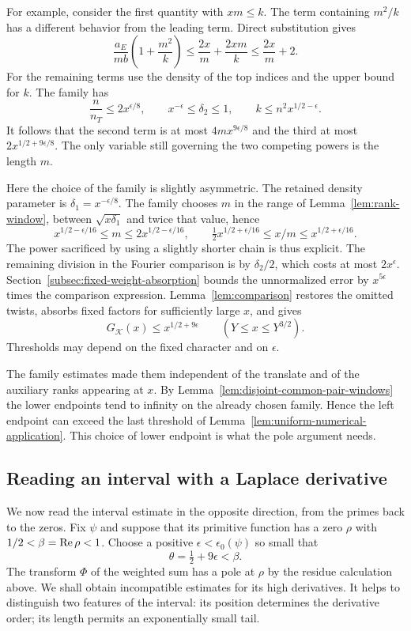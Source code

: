 For example, consider the first quantity with \(xm\le k\).
The term containing \(m^2/k\) has a different behavior from the
leading term. Direct substitution gives
\[
 \frac{a_E}{mb}\left(1+\frac{m^2}{k}\right)
       \le \frac{2x}{m}+\frac{2xm}{k}
       \le \frac{2x}{m}+2 .
\]
For the remaining terms use the density of the top indices and
the upper bound for \(k\). The family has
\[
       \frac{n}{n_T}\le2x^{\epsilon/8},\qquad
       x^{-\epsilon}\le\delta_2\le1,\qquad
       k\le n^2 x^{1/2-\epsilon}.
\]
It follows that the second term is at most \(4m x^{9\epsilon/8}\)
and the third at most \(2x^{1/2+9\epsilon/8}\). The only variable
still governing the two competing powers is the length \(m\).

Here the choice of the family is slightly asymmetric. The retained
density parameter is \(\delta_1=x^{-\epsilon/8}\).
The family chooses \(m\) in the range of Lemma~\ref{lem:rank-window}, between
\(\sqrt{x\delta_1}\) and twice that value, hence
\[
 x^{1/2-\epsilon/16}\le m\le 2x^{1/2-\epsilon/16},
 \qquad
 \tfrac12 x^{1/2+\epsilon/16}\le x/m\le x^{1/2+\epsilon/16}.
\]
The power sacrificed by using a slightly shorter chain is thus
explicit. The remaining division in the Fourier comparison is by
\(\delta_2/2\), which costs at most \(2x^\epsilon\).
Section~\ref{subsec:fixed-weight-absorption} bounds the unnormalized
error by \(x^{5\epsilon}\) times the comparison expression.
Lemma~\ref{lem:comparison} restores the omitted twists, absorbs
fixed factors for sufficiently large \(x\), and gives
\[
       G_{\mathcal K}(x)\le x^{1/2+9\epsilon}
                          \qquad(Y\le x\le Y^{3/2}).
\]
Thresholds may depend on the fixed character and on \(\epsilon\).

The family estimates made them independent of the translate and of
the auxiliary ranks appearing at \(x\). By Lemma~\ref{lem:disjoint-common-pair-windows} the lower endpoints tend to infinity on the already chosen family. Hence the left endpoint can exceed the last threshold of Lemma~\ref{lem:uniform-numerical-application}.
This choice of lower endpoint is what the pole argument needs.

\subsection{Reading an interval with a Laplace derivative}

We now read the interval estimate in the opposite direction, from the primes back to
the zeros. Fix \(\psi\) and suppose that its primitive function has a zero
\(\rho\) with \(1/2<\beta=\operatorname{Re}\rho<1\). Choose a positive
\(\epsilon<\epsilon_0(\psi)\) so small that
\[
             \theta=\tfrac12+9\epsilon<\beta .
\]
The transform \(\Phi\) of the weighted sum has a pole at \(\rho\)
by the residue calculation above. We shall obtain incompatible
estimates for its high derivatives. It helps to distinguish two
features of the interval: its position determines the derivative
order; its length permits an exponentially small tail.

